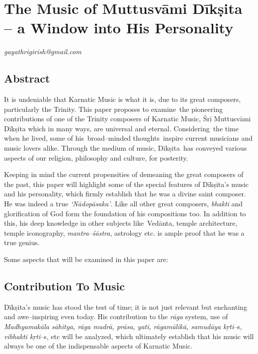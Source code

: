 
\chapter{The Music of Muttusvāmi Dīkṣita – a Window into His Personality}\label{chapter1}


\begin{flushright}
\textit{gayathrigirish@gmail.com}
\end{flushright}


\section*{Abstract}

It is undeniable that Karnatic Music is what it is, due to its great composers, particularly the Trinity. This paper proposes to examine the pioneering contributions of one of the Trinity composers of Karnatic Music, Śrī Muttusvāmi Dīkṣita which in many ways, are universal and eternal. Considering the time when he lived, some of his broad–minded thoughts inspire current musicians and music lovers alike. Through the medium of music, Dīkṣita has conveyed various aspects of our religion, philosophy and culture, for posterity.

Keeping in mind the current propensities of demeaning the great composers of the past, this paper will highlight some of the special features of Dīkṣita’s music and his personality, which firmly establish that he was a divine saint composer. He was indeed a true \textit{‘Nādopāsaka’}. Like all other great composers, \textit{bhakti} and glorification of God form the foundation of his compositions too. In addition to this, his deep knowledge in other subjects like Vedānta, temple architecture, temple iconography, \textit{mantra–śāstra}, astrology etc. is ample proof that he was a true genius. 

Some aspects that will be examined in this paper are:


\section*{Contribution To Music}

Dīkṣita’s music has stood the test of time; it is not just relevant but enchanting and awe–inspiring even today. His contribution to the \textit{rāga} system, use of \textit{Madhyamakāla sāhitya, rāga mudrā, prāsa, yati, rāgamālikā, samudāya} \textit{kṛti}–s, \textit{vibhakti kṛti}–s, etc will be analyzed, which ultimately establish that his music will always be one of the indispensable aspects of Karnatic Music.


